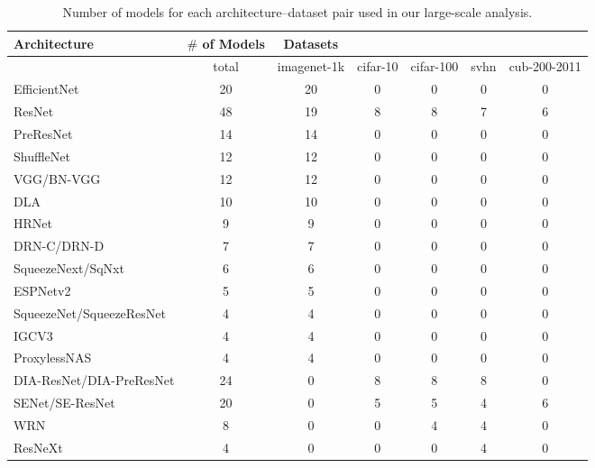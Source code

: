 
\begin{table}[t]
\small
\begin{center}
\begin{tabular}{|l|c|c|c|c|c|c|}
\hline
Architecture & $\#$ of Models & Datasets & & & & \\
\hline

  & total &imagenet-1k & cifar-10 & cifar-100 & svhn & cub-200-2011 \\
\hline
EfficientNet & 20 &20 & 0 & 0 & 0 & 0 \\
ResNet & 48 &19 & 8 & 8 & 7 & 6 \\
PreResNet & 14 &14 & 0 & 0 & 0 & 0 \\
ShuffleNet & 12 &12 & 0 & 0 & 0 & 0 \\
VGG/BN-VGG & 12 &12 & 0 & 0 & 0 & 0 \\
DLA & 10 &10 & 0 & 0 & 0 & 0 \\
HRNet & 9 &9 & 0 & 0 & 0 & 0 \\
DRN-C/DRN-D & 7 &7 & 0 & 0 & 0 & 0 \\
SqueezeNext/SqNxt & 6 &6 & 0 & 0 & 0 & 0 \\
ESPNetv2 & 5 &5 & 0 & 0 & 0 & 0 \\
SqueezeNet/SqueezeResNet & 4 &4 & 0 & 0 & 0 & 0 \\
IGCV3 & 4 &4 & 0 & 0 & 0 & 0 \\
ProxylessNAS & 4 &4 & 0 & 0 & 0 & 0 \\
DIA-ResNet/DIA-PreResNet & 24 &0 & 8 & 8 & 8 & 0 \\
SENet/SE-ResNet & 20 &0 & 5 & 5 & 4 & 6 \\
WRN & 8 &0 & 0 & 4 & 4 & 0 \\
ResNeXt & 4 &0 & 0 & 0 & 4 & 0 \\

\hline
\end{tabular}
\end{center}
\caption{Number of models for each architecture--dataset pair used in our large-scale analysis.}
\label{table:architectures}
\end{table}

